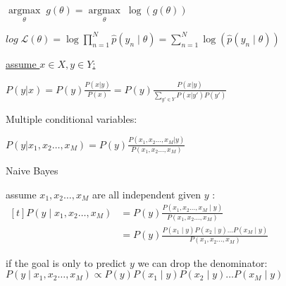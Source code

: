 \documentclass[landscape, a4paper]{article}
\begin{document}
\begin{minipage}[t]{0.2\linewidth}
\begin{betterlist}
\begin{betterlist}
			\begin{betterlist}
				\item $\underset{\theta}{\operatorname{argmax}}\;g(\theta)=\underset{\theta}{\operatorname{argmax}}\;\log (g(\theta))$
				\item $\displaystyle log\;\mathcal{L}(\theta) = \log \prod_{n=1}^N \hat{p}\left(y_n \mid \theta\right)=\sum_{n=1}^N \log \left(\hat{p}\left(y_n \mid \theta\right)\right)$
			\end{betterlist}
		\end{betterlist}
		\item {}
		\item {}
		\begin{betterlist}
			\item \underline{assume $x \in X, y \in Y$:}
			\begin{betterlist}
				\item $\displaystyle P(y | x) = P(y)\frac{P(x | y)}{P(x)} = P(y) \frac{P(x | y)}{\sum_{y′\in Y} P(x | y')P(y')}$
			\end{betterlist}
			\item \alert{Multiple conditional variables:}

			$\displaystyle P(y | x_1, x_2 \ldots , x_M) = P(y)\frac{P(x_1, x_2 \ldots , x_M | y)}{P(x_1, x_2 \ldots, x_M)}$
			\item {}
			\item \alert{Naive Bayes}
			\begin{betterlist}
				\item assume $x_1, x_2 \ldots, x_M$ are all independent given $y$ :\\ $\begin{aligned}[t]
						P\left(y \mid x_1, x_2 \ldots, x_M\right) & =P(y) \frac{P\left(x_1, x_2 \ldots, x_M \mid y\right)}{P\left(x_1, x_2 \ldots, x_M\right)}                                         \\
						                                          & =P(y) \frac{P\left(x_1 \mid y\right) P\left(x_2 \mid y\right) \ldots P\left(x_M \mid y\right)}{P\left(x_1, x_2 \ldots, x_M\right)}
					\end{aligned}$
				\item if the goal is only to predict $y$ we can drop the denominator:\\ $P\left(y \mid x_1, x_2 \ldots, x_M\right) \propto P(y) P\left(x_1 \mid y\right) P\left(x_2 \mid y\right) \ldots P\left(x_M \mid y\right)$
			\end{betterlist}
		\end{betterlist}
	\end{betterlist}


\end{minipage}
\end{document}
